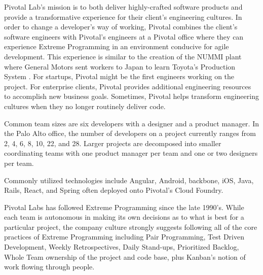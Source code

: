 Pivotal Lab's mission is to both deliver highly-crafted software products and provide a transformative experience for their client's engineering cultures. In order to change a developer's way of working, Pivotal combines the client's software engineers with Pivotal's engineers at a Pivotal office where they can experience Extreme Programming in an environment conducive for agile development. This experience is similar to the creation of the NUMMI plant where General Motors sent workers to Japan to learn Toyota's Production System \cite{Nummi}. For startups, Pivotal might be the first engineers working on the project. For enterprise clients, Pivotal provides additional engineering resources to accomplish new business goals. Sometimes, Pivotal helps transform engineering cultures when they no longer routinely deliver code.  

Common team sizes are six developers with a designer and a product manager. In the Palo Alto office, the number of developers on a project currently ranges from 2, 4, 6, 8, 10, 22, and 28. Larger projects are decomposed into smaller coordinating teams with one product manager per team and one or two designers per team. 

Commonly utilized technologies include Angular, Android, backbone, iOS, Java, Rails, React, and Spring often deployed onto Pivotal's Cloud Foundry. 

Pivotal Labs has followed Extreme Programming \cite{ExtremeProgramming2004} since the late 1990's. While each team is autonomous in making its own decisions as to what is best for a particular project, the company culture strongly suggests following all of the core practices of Extreme Programming including Pair Programming, Test Driven Development, Weekly Retrospectives, Daily Stand-ups, Prioritized Backlog, Whole Team ownership of the project and code base, plus Kanban's notion of work flowing through people.


